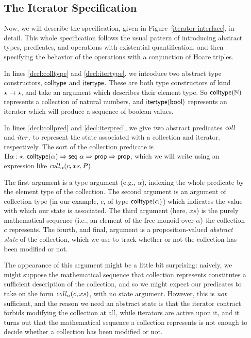 \subsection{The Iterator Specification}

Now, we will describe the specification, given in
Figure~\ref{iterator-interface}, in detail. This whole specification
follows the usual pattern of introducing abstract types, predicates,
and operations with existential quantification, and then specifying
the behavior of the operations with a conjunction of Hoare triples.

In lines \ref{decl:colltype} and \ref{decl:itertype}, we introduce two
abstract type constructors, $\mathsf{colltype}$ and $\mathsf{itertype}$. These are
both type constructors of kind $\star \to \star$, and take an argument
which describes their element type. So $\mathsf{colltype}(\mathbb{N})$ represents a
collection of natural numbers, and $\mathsf{itertype}(\mathsf{bool})$ represents an
iterator which will produce a sequence of boolean values.

In lines \ref{decl:collpred} and \ref{decl:iterpred}, we give two
abstract predicates $\mathit{coll}$ and $\mathit{iter}$, to represent the
state associated with a collection and iterator, respectively. The
sort of the collection predicate is $\Pi \alpha:\star.\;
\mathsf{colltype}(\alpha) \Rightarrow \mathsf{seq}\;{\alpha} \Rightarrow \mathsf{prop} \Rightarrow \mathsf{prop}$, which
we will write using an expression like $\mathit{coll}_\alpha(c, xs, P)$.

The first argument is a type argument (e.g., $\alpha$), indexing the
whole predicate by the element type of the collection. The second
argument is an argument of collection type (in our example, $c$, of
type $\mathsf{colltype}(\alpha)$) which indicates the value with which our
state is associated. The third argument (here, $xs$) is the purely
mathematical sequence (i.e., an element of the free monoid over
$\alpha$) the collection $c$ represents.  The fourth, and final,
argument is a proposition-valued \emph{abstract state} of the
collection, which we use to track whether or not the collection has
been modified or not.

The appearance of this argument might be a little bit surprising:
naively, we might suppose the mathematical sequence that collection
represents constitutes a sufficient description of the collection, and
so we might expect our predicates to take on the form
$\mathit{coll}_\alpha(c, xs)$, with no state argument. However, this is
\emph{not} sufficient, and the reason we need an abstract state is
that the iterator contract forbids modifying the collection at all,
while iterators are active upon it, and it turns out that the
mathematical sequence a collection represents is not enough to decide
whether a collection has been modified or not.

